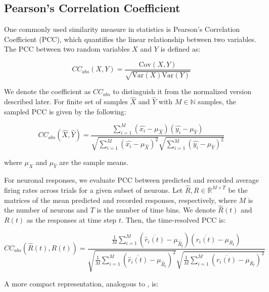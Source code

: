 \subsection{Pearson's Correlation Coefficient}
\label{subsec:pearson_cc}
One commonly used similarity measure in statistics is Pearson's Correlation Coefficient (PCC), which quantifies the linear relationship between two variables. The PCC between two random variables $X$ and $Y$ is defined as:

\begin{equation}
    CC_{abs}(X, Y) = \frac{\text{Cov}(X,Y)}{\sqrt{\text{Var}(X)\text{Var}(Y)}}
\end{equation}
\label{eq:pearson_general}

We denote the coefficient as $CC_{abs}$ to distinguish it from the normalized version described later. For finite set of samples $\hat{X}$ and $\hat{Y}$ with $M \in \mathbb{N}$ samples, the sampled PCC is given by the following:

\begin{equation}
    CC_{abs}(\hat{X}, \hat{Y}) 
    = \frac{\sum_{i=1}^{M}(\hat{x_i} - \mu_{\hat{X}})(\hat{y_i} - \mu_{\hat{Y}})}
    {\sqrt{\sum_{i=1}^{M}(\hat{x_i} - \mu_{\hat{X}})^{2}}
    \sqrt{\sum_{i=1}^{M}(\hat{y_i} - \mu_{\hat{Y}})^{2}}}
\end{equation}
\label{eq:pearson_sampled}

where $\mu_{\hat{X}}$ and $\mu_{\hat{Y}}$ are the sample means.

For neuronal responses, we evaluate PCC between predicted and recorded average firing rates across trials for a given subset of neurons. Let $\hat{R}, R \in \mathbb{R}^{M \times T}$ be the matrices of the mean predicted and recorded responses, respectively, where $M$ is the number of neurons and $T$ is the number of time bins. We denote $\hat{R}(t)$ and $R(t)$ as the responses at time step $t$. Then, the time-resolved PCC is:

\begin{equation}
    CC_{abs}(\hat{R}(t), R(t)) = 
    \frac{\frac{1}{M} \sum_{i=1}^{M} 
    (\overline{\hat{r}_i(t)} - \mu_{\overline{\hat{R}_t}})
    (\overline{r_i(t)} - \mu_{\overline{R_t}})}
    {\sqrt{\frac{1}{M} \sum_{i=1}^{M} (\overline{\hat{r}_i(t)} - \mu_{\overline{\hat{R}_t}})^2}
    \sqrt{\frac{1}{M} \sum_{i=1}^{M} (\overline{r_i(t)} - \mu_{\overline{R_t}})^2}}
\end{equation}
\label{eq:pearson_neurons}

A more compact representation, analogous to \citet{Wang2023towards}, is:


